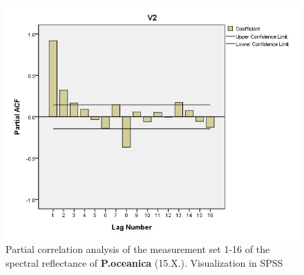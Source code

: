 \documentclass[10pt, a4paper]{article}
\begin{document}
\begin{appendices}
\begin{figure}[H]
\centering
\includegraphics[scale=0.45]{Partial_Corr.jpg}
\caption{Partial correlation analysis of the measurement set 1-16 of the spectral reflectance of \textbf{P.oceanica} (15.X.). Visualization in SPSS}
\label{fig:51}
\end{figure}
\pagebreak
\newpage



\end{appendices}
\end{document}
